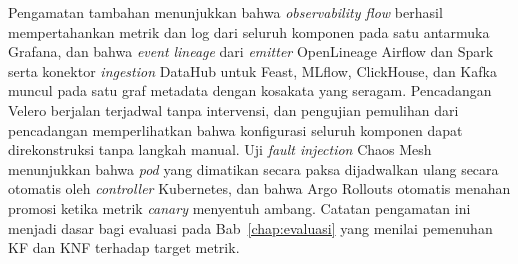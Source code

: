 Pengamatan tambahan menunjukkan bahwa \textit{observability flow} berhasil mempertahankan metrik dan log dari seluruh komponen pada satu antarmuka Grafana, dan bahwa \textit{event} \textit{lineage} dari \textit{emitter} OpenLineage Airflow dan Spark serta konektor \textit{ingestion} DataHub untuk Feast, MLflow, ClickHouse, dan Kafka muncul pada satu graf metadata dengan kosakata yang seragam. Pencadangan Velero berjalan terjadwal tanpa intervensi, dan pengujian pemulihan dari pencadangan memperlihatkan bahwa konfigurasi seluruh komponen dapat direkonstruksi tanpa langkah manual. Uji \textit{fault injection} Chaos Mesh menunjukkan bahwa \textit{pod} yang dimatikan secara paksa dijadwalkan ulang secara otomatis oleh \textit{controller} Kubernetes, dan bahwa Argo Rollouts otomatis menahan promosi ketika metrik \textit{canary} menyentuh ambang. Catatan pengamatan ini menjadi dasar bagi evaluasi pada Bab~\ref{chap:evaluasi} yang menilai pemenuhan KF dan KNF terhadap target metrik.
